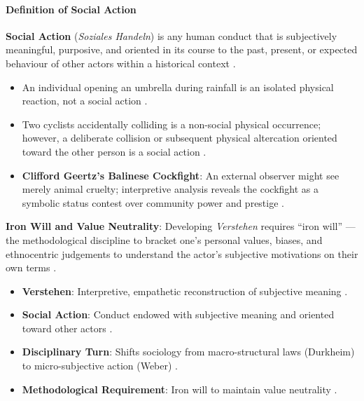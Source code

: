 \paragraph{Definition of Social Action}
\begin{KeyConcept}
\textbf{Social Action} (\textit{Soziales Handeln}) is any human conduct that is subjectively meaningful, purposive, and oriented in its course to the past, present, or expected behaviour of other actors within a historical context .
\end{KeyConcept}

\begin{ExampleBox}
\begin{itemize}
    \item An individual opening an umbrella during rainfall is an isolated physical reaction, not a social action .
    \item Two cyclists accidentally colliding is a non-social physical occurrence; however, a deliberate collision or subsequent physical altercation oriented toward the other person is a social action .
    \item \textbf{Clifford Geertz's Balinese Cockfight}: An external observer might see merely animal cruelty; interpretive analysis reveals the cockfight as a symbolic status contest over community power and prestige .
\end{itemize}
\end{ExampleBox}

\begin{KeyConcept}
\textbf{Iron Will and Value Neutrality}: Developing \textit{Verstehen} requires ``iron will'' --- the methodological discipline to bracket one's personal values, biases, and ethnocentric judgements to understand the actor's subjective motivations on their own terms .
\end{KeyConcept}

\begin{QuickRevision}
\begin{itemize}
    \item \textbf{Verstehen}: Interpretive, empathetic reconstruction of subjective meaning .
    \item \textbf{Social Action}: Conduct endowed with subjective meaning and oriented toward other actors .
    \item \textbf{Disciplinary Turn}: Shifts sociology from macro-structural laws (Durkheim) to micro-subjective action (Weber) .
    \item \textbf{Methodological Requirement}: Iron will to maintain value neutrality .
\end{itemize}
\end{QuickRevision}

